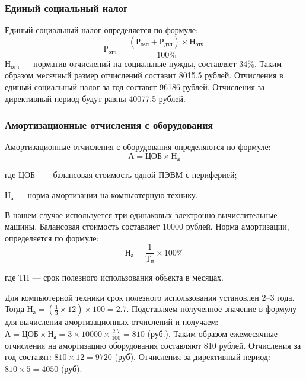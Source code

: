 \subsubsection{Единый социальный налог}
Единый социальный налог определяется по формуле:
\begin{equation}
    \textrm{Р}_\textrm{отч} = \frac{(\textrm{Р}_\textrm{озп} + \textrm{Р}_\textrm{дзп}) \times{} \textrm{Н}_\textrm{отч}} {100\%}
\end{equation}
$\textrm{Н}_\textrm{отч}$ --- норматив отчислений на социальные  нужды, составляет 34\%.
Таким образом месячный размер отчислений составит 8015.5 рублей.
Отчисления в единый социальный налог за год составят 96186 рублей.
Отчисления за директивный период будут равны 40077.5 рублей.

\subsubsection{Амортизационные  отчисления  с  оборудования}
Амортизационные отчисления с оборудования определяются по формуле:
\begin{equation}
    \textrm{А} = \textrm{ЦОБ} \times{} \textrm{Н}_\textrm{а}
\end{equation}
\begin{ESKDexplanation}
	\item[где ]{} $\textrm{ЦОБ}$ --— балансовая стоимость одной ПЭВМ с периферией;
	\item{} $\textrm{Н}_\textrm{а}$ --- норма амортизации на компьютерную технику.
\end{ESKDexplanation}
В нашем случае используется три одинаковых электронно-вычислительные машины.
Балансовая стоимость составляет 10000 рублей.
Норма амортизации, определяется по формуле:
\begin{equation}
	\textrm{Н}_\textrm{а} = \frac{1}{\textrm{Т}_\textrm{п}} \times{} 100\%
\end{equation}
\begin{ESKDexplanation}
	\item[где ] ТП --- срок полезного использования объекта в месяцах.
\end{ESKDexplanation}
Для компьютерной техники срок полезного использования установлен 2--3 года.
Тогда $\textrm{Н}_\textrm{а}= (\frac{1}{3} \times{} 12) \times{} 100 = 2.7$.
Подставляем полученное значение в формулу для вычисления амортизационных отчислений
и получаем: $\textrm{А} = \textrm{ЦОБ} \times{} \textrm{Н}_\textrm{а} = 3 \times{} 10000 \times{} \frac{2.7}{100} = 810$ (руб.).
Таким образом ежемесячные отчисления на амортизацию оборудования составляют
810 рублей. Отчисления за год составят: $810 \times{} 12 = 9720$ (руб). Отчисления за
директивный период: $810 \times{} 5 = 4050$ (руб).

